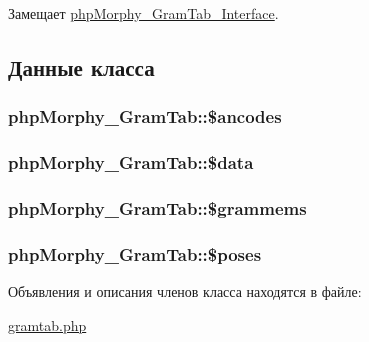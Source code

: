 Замещает \hyperlink{interfacephpMorphy__GramTab__Interface_a4fc163ef8da2bb73ba1d99795619ef40}{phpMorphy\_\-GramTab\_\-Interface}.



\subsection{Данные класса}
\hypertarget{classphpMorphy__GramTab_a6aeaac9d03957bd2724991f4bbcad082}{
\subsubsection[{\$ancodes}]{\setlength{\rightskip}{0pt plus 5cm}phpMorphy\_\-GramTab::\$ancodes}}
\label{classphpMorphy__GramTab_a6aeaac9d03957bd2724991f4bbcad082}
\hypertarget{classphpMorphy__GramTab_ab0d2cee21fc1c75117cd794b493472b6}{
\subsubsection[{\$data}]{\setlength{\rightskip}{0pt plus 5cm}phpMorphy\_\-GramTab::\$data}}
\label{classphpMorphy__GramTab_ab0d2cee21fc1c75117cd794b493472b6}
\hypertarget{classphpMorphy__GramTab_af618e178ed9eff879c73ec4ad05bfd78}{
\subsubsection[{\$grammems}]{\setlength{\rightskip}{0pt plus 5cm}phpMorphy\_\-GramTab::\$grammems}}
\label{classphpMorphy__GramTab_af618e178ed9eff879c73ec4ad05bfd78}
\hypertarget{classphpMorphy__GramTab_a9dc10f87d1b6ff4f1e6e8bc3a17b9535}{
\subsubsection[{\$poses}]{\setlength{\rightskip}{0pt plus 5cm}phpMorphy\_\-GramTab::\$poses}}
\label{classphpMorphy__GramTab_a9dc10f87d1b6ff4f1e6e8bc3a17b9535}


Объявления и описания членов класса находятся в файле:\begin{DoxyCompactItemize}
\item 
\hyperlink{gramtab_8php}{gramtab.php}\end{DoxyCompactItemize}
